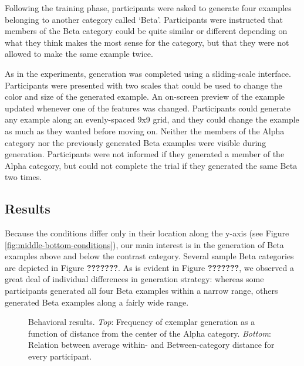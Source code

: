 \documentclass[10pt,letterpaper]{article}
\newcommand\inputpgf[2]{{
\let\pgfimageWithoutPath\pgfimage
\renewcommand{\pgfimage}[2][]{\pgfimageWithoutPath[##1]{#1/##2}}

}}
\begin{document}
Following the training phase, participants were asked to generate four examples belonging to another category called `Beta'. Participants were instructed that members of the Beta category could be quite similar or different depending on what they think makes the most sense for the category, but that they were not allowed to make the same example twice. 

As in the \citet{jern2013probabilistic} experiments, generation was completed using a sliding-scale interface. Participants were presented with two scales that could be used to change the color and size of the generated example. An on-screen preview of the example updated whenever one of the features was changed. Participants could generate any example along an evenly-spaced 9x9 grid, and they could change the example as much as they wanted before moving on. Neither the members of the Alpha category nor the previously generated Beta examples were visible during generation. Participants were not informed if they generated a member of the Alpha category, but could not complete the trial if they generated the same Beta two times.



\subsection{Results}

Because the conditions differ only in their location along the y-axis (see Figure \ref{fig:middle-bottom-conditions}), our main interest is in the generation of Beta examples above and below the contrast category. Several sample Beta categories are depicted in Figure \textbf{???????}. As is evident in Figure \textbf{???????}, we observed a great deal of individual differences in generation strategy: whereas some participants generated all four Beta examples within a narrow range, others generated Beta examples along a fairly wide range. 

\begin{figure}
    \begin{center}
    \inputpgf{figs/}{distance.figs.pgf}
    \caption{Behavioral results. \textit{Top}: Frequency of exemplar generation as a function of distance from the center of the Alpha category. \textit{Bottom}: Relation between average within- and Between-category distance for every participant. }
    \label{fig:distance.figs}
    \end{center}
\end{figure}
\end{document}
